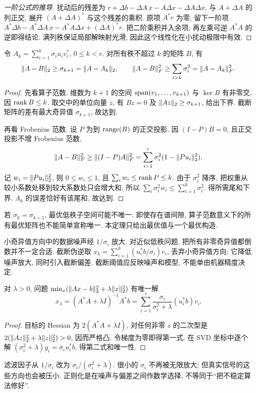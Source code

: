 \begin{proof}[一阶公式的推导]
扰动后的残差为 $r+\Delta b-\Delta A\,x-A\Delta x-\Delta A\Delta x$. 与 $A+\Delta A$ 的列正交, 展开 $(A+\Delta A)^*$ 与这个残差的乘积. 原项 $A^*r$ 为零, 留下一阶项 $A^*\Delta b-A^*\Delta A\,x-A^*A\Delta x+(\Delta A)^*r$. 把二阶乘积并入余项, 再左乘可逆 $A^*A$ 的逆即得结论. 满列秩保证局部解映射光滑, 因此这个线性化在小扰动极限中有效.
\end{proof}

\begin{theorem}[截断 SVD]\label{thm:ey}
令 $A_k=\sum_{i=1}^k\sigma_i u_iv_i^*$, $0\le k<r$. 对所有秩不超过 $k$ 的矩阵 $B$, 有
\[
\lVert A-B\rVert_2\ge\sigma_{k+1}=\lVert A-A_k\rVert_2,
\qquad
\lVert A-B\rVert_F^2\ge\sum_{i>k}\sigma_i^2=\lVert A-A_k\rVert_F^2.
\]
\end{theorem}
\begin{proof}
先看算子范数. 维数为 $k+1$ 的空间 $\operatorname{span}(v_1,\ldots,v_{k+1})$ 与 $\ker B$ 有非零交, 因 $\operatorname{rank} B\le k$. 取交中的单位向量 $z$, 有 $Bz=0$ 及 $\lVert Az\rVert_2\ge\sigma_{k+1}$, 给出下界. 截断矩阵的差有最大奇异值 $\sigma_{k+1}$, 故达到.

再看 Frobenius 范数. 设 $P$ 为到 $\operatorname{range}(B)$ 的正交投影. 因 $(I-P)B=0$, 且正交投影不增 Frobenius 范数,
\[
\lVert A-B\rVert_F^2\ge\lVert (I-P)A\rVert_F^2
=\sum_{i=1}^r\sigma_i^2(1-\lVert Pu_i\rVert_2^2).
\]
记 $w_i=\lVert Pu_i\rVert_2^2$, 则 $0\le w_i\le1$, 且 $\sum_iw_i\le\operatorname{rank} P\le k$. 由于 $\sigma_i^2$ 降序, 把权重从较小系数处移到较大系数处只会增大和, 所以 $\sum_i\sigma_i^2w_i\le\sum_{i=1}^k\sigma_i^2$. 得所需尾和下界. $A_k$ 的误差恰好有该尾和, 故达到.
\end{proof}
若 $\sigma_k=\sigma_{k+1}$, 最优低秩子空间可能不唯一. 即使存在谱间隙, 算子范数意义下的所有最优矩阵也不能简单宣称唯一. 本定理只给出最优值与一个最优构造.

小奇异值方向中的数据噪声经 $1/\sigma_i$ 放大. 对近似低秩问题, 把所有非零奇异值都倒数并不一定合适. 截断伪逆取
$x_k=\sum_{i=1}^k(u_i^*b/\sigma_i)v_i$, 丢弃小奇异值方向; 它降低噪声放大, 同时引入截断偏差. 截断阈值应反映噪声和模型, 不能单由机器精度决定.

\begin{proposition}
对 $\lambda>0$, 问题 $\min_x(\lVert Ax-b\rVert_2^2+\lambda\lVert x\rVert_2^2)$ 有唯一解
\[
x_\lambda=(A^*A+\lambda I)^{-1}A^*b
=\sum_{i=1}^r\frac{\sigma_i}{\sigma_i^2+\lambda}(u_i^*b)v_i.
\]
\end{proposition}
\begin{proof}
目标的 Hessian 为 $2(A^*A+\lambda I)$, 对任何非零 $z$ 的二次型是 $2(\lVert Az\rVert_2^2+\lambda\lVert z\rVert_2^2)>0$, 因而严格凸. 令梯度为零即得第一式. 在 SVD 坐标中逐个解 $(\sigma_i^2+\lambda)y_i=\sigma_i u_i^*b$, 得第二式和唯一性.
\end{proof}
滤波因子从 $1/\sigma_i$ 改为 $\sigma_i/(\sigma_i^2+\lambda)$. 很小的 $\sigma_i$ 不再被无限放大; 但真实信号的这些方向也会被压小. 正则化是在噪声与偏差之间作数学选择, 不等同于“把不稳定算法修好”.

